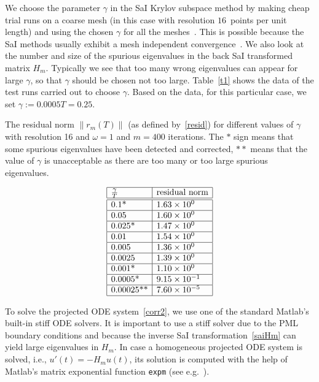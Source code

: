 \documentclass[11pt]{elsarticle}
\newcommand{\e}[1]{\times 10^{#1}}
\begin{document}
We choose the parameter $\gamma$ in the SaI Krylov subspace method
by making cheap trial
runs on a coarse mesh (in this case with resolution $16$~points
per unit length) and using the chosen $\gamma$ for all the
meshes~\cite{Botchev2016}.
This is possible because the SaI methods usually exhibit 
a mesh independent 
convergence~\cite{EshofHochbruck06,GoecklerGrimm2014,Botchev2016}.
We also look at the number and size of the spurious eigenvalues
in the back SaI transformed matrix $H_m$.  
Typically we see that too many wrong eigenvalues can 
appear for large $\gamma$, so that $\gamma$ should be chosen 
not too large.
Table~\ref{t1} shows
the data of the test runs carried out to choose $\gamma$.  Based 
on the data, for this particular case, we set $\gamma:=0.0005 T = 0.25$.

\begin{table}
\caption{The residual norm $\|r_m(T)\|$
(as defined by~\eqref{resid})
for different values of $\gamma$ with resolution 16 and $\omega = 1$
and $m=400$ iterations. 
The $*$ sign means that some spurious eigenvalues have been detected and 
corrected, 
$**$ means that the value of $\gamma$ is unacceptable as 
there are too many or too large spurious eigenvalues.}
\label{t1}
\centering
\[
\begin{array}{|l|l|} \hline
\frac{\gamma}{T} & \text{residual norm} \\ \hline\hline
0.1$*$ & 1.63 \e{0} \\ \hline
0.05 & 1.60 \e{0} \\ \hline
0.025$*$ & 1.47 \e{0} \\ \hline
0.01 & 1.54 \e{0} \\ \hline
0.005 & 1.36 \e{0} \\ \hline
0.0025 & 1.39 \e{0} \\ \hline
0.001$*$ & 1.10 \e{0} \\ \hline
0.0005$*$ & 9.15 \e{-1} \\ \hline
0.00025$**$ & 7.60 \e{-5} \\ \hline
\end{array}
\]
\end{table}

To solve the projected ODE system~\eqref{corr2}, we use 
one of the standard Matlab's built-in stiff ODE solvers.
It is important to use a stiff solver due to the PML
boundary conditions and because the inverse SaI 
transformation~\eqref{saiHm} can yield large eigenvalues in $H_m$.
In case a homogeneous projected ODE system is solved,
i.e., $u'(t)=-H_mu(t)$, 
its solution is computed with the help of Matlab's matrix exponential
function \texttt{expm} (see e.g.~\cite{Higham_bookFM}).
\end{document}
